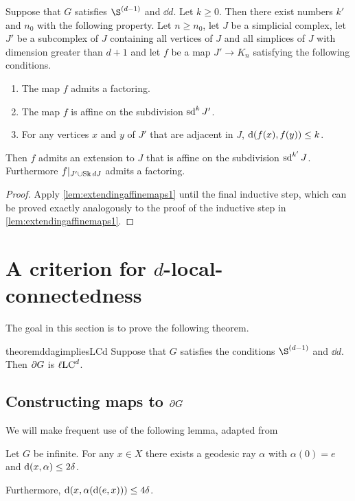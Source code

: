 \documentclass[a4paper]{article}
\begin{document}
\begin{proposition}\label{prop:extendingaffinemaps2}
  Suppose that $G$ satisfies $\Sd{d-1}$ and $\dd{d}$. Let $k \geq 0$. Then
  there exist numbers $k'$ and $n_0$ with the following property. Let $n \geq
  n_0$, let $J$ be a simplicial complex, let $J'$ be a subcomplex of $J$
  containing all vertices of $J$ and all simplices of $J$ with dimension
  greater than $d+1$ and let $f$ be a map $J' \to K_n$ satisfying the following
  conditions.
  \begin{enumerate}
    \item The map $f$ admits a factoring.
    \item The map $f$ is affine on the subdivision $\operatorname{sd}^k J'$.
    \item For any vertices $x$ and $y$ of $J'$ that are adjacent in $J$,
      $\operatorname{d}(f(x), f(y)) \leq k$.
  \end{enumerate}
  Then $f$ admits an extension to $J$ that is affine on the subdivision
  $\operatorname{sd}^{k'} J$. Furthermore $f\vert_{J' \cup \operatorname{Sk}{d} J}$ admits a
  factoring.
\end{proposition}

\begin{proof}
  Apply \cref{lem:extendingaffinemaps1} until the final inductive step, which
  can be proved exactly analogously to the proof of the inductive step in
  \cref{lem:extendingaffinemaps1}.
\end{proof}

\section{A criterion for $d$-local-connectedness}\label{sec:criterion}

The goal in this section is to prove the following theorem.

\begin{restatable}{theorem}{ddagimpliesLCd}
  \label{thm:ddagimpliesLCd}
  Suppose that $G$ satisfies the conditions $\Sd{d-1}$ and $\dd{d}$. Then 
  $\partial G$ is $\ell\mathrm{LC}^{d}$.
\end{restatable}

\subsection{Constructing maps to $\partial G$}

We will make frequent use of the following lemma, adapted 
from~\cite{bestvinamess91}

\begin{lemma}\cite{bestvinamess91}\label{lem:near_geod_rays}
  Let $G$ be infinite. For any $x \in X$ there exists a geodesic ray $\alpha$ 
  with $\alpha(0) = e$ and $\operatorname{d}(x,\alpha) \leq 2\delta$. 
  
  Furthermore, $\operatorname{d}(x, \alpha(\operatorname{d}(e,x))) \leq 4\delta$.
\end{lemma}
\end{document}
